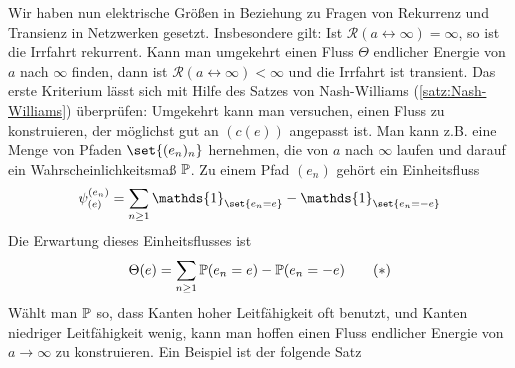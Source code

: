 Wir haben nun elektrische Größen in Beziehung zu Fragen von Rekurrenz und Transienz in Netzwerken gesetzt. Insbesondere gilt: Ist $\mathcal{R}(a \leftrightarrow \infty)  = \infty $, so ist die Irrfahrt rekurrent. Kann man umgekehrt einen Fluss $\Theta$ endlicher Energie von $a$ nach $\infty$ finden, dann ist $\mathcal{R}(a \leftrightarrow \infty)< \infty$ und die Irrfahrt ist transient. Das erste Kriterium lässt sich mit Hilfe des Satzes von Nash-Williams (\ref{satz:Nash-Williams}) überprüfen: Umgekehrt kann man versuchen, einen Fluss zu konstruieren, der möglichst gut an $(c(e))$ angepasst ist. Man kann z.B. eine Menge von Pfaden $\set{(e_n)_n}$ hernehmen, die von $a$ nach $\infty$ laufen und darauf ein Wahrscheinlichkeitsmaß $\mathbb{P}$. Zu einem Pfad $(e_n)$ gehört ein Einheitsfluss 
\begin{align}
	\psi^{(e_n)}_{(e)} = \sum\limits_{n \geq 1} \mathds{1}_{\set{e_n = e}} - \mathds{1}_{\set{e_n = -e}}
\end{align}
Die Erwartung dieses Einheitsflusses ist
\begin{gather}
	\Theta(e) = \sum\limits_{n \geq 1} \prop{e_n = e} - \prop{e_n = -e} \tag{$*$}\label{eqn:4-1}
\end{gather}
Wählt man $\mathbb{P}$ so, dass Kanten hoher Leitfähigkeit oft benutzt, und Kanten niedriger Leitfähigkeit wenig, kann man hoffen einen Fluss endlicher Energie von $a \to \infty$ zu konstruieren. Ein Beispiel ist der folgende Satz

